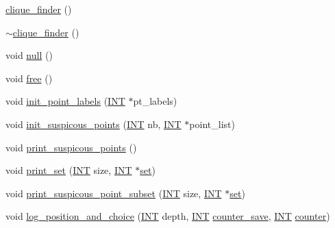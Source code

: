\begin{DoxyCompactItemize}
\item 
\mbox{\hyperlink{classclique__finder_a996255a587a5338e5214d54a6d63b95a}{clique\+\_\+finder}} ()
\item 
\mbox{\hyperlink{classclique__finder_a5a64ff27a69e4dcaba50818135adcc3a}{$\sim$clique\+\_\+finder}} ()
\item 
void \mbox{\hyperlink{classclique__finder_af88651ad5d235f543c65f70004de44e3}{null}} ()
\item 
void \mbox{\hyperlink{classclique__finder_ab9dbf7e2012a2047558b980a0e485569}{free}} ()
\item 
void \mbox{\hyperlink{classclique__finder_ab294bd8be39be9f6d6515ed7cee0dd22}{init\+\_\+point\+\_\+labels}} (\mbox{\hyperlink{galois_8h_a09fddde158a3a20bd2dcadb609de11dc}{I\+NT}} $\ast$pt\+\_\+labels)
\item 
void \mbox{\hyperlink{classclique__finder_a2f2b8331c4728e5edccd28ac0ffb7dbd}{init\+\_\+suspicous\+\_\+points}} (\mbox{\hyperlink{galois_8h_a09fddde158a3a20bd2dcadb609de11dc}{I\+NT}} nb, \mbox{\hyperlink{galois_8h_a09fddde158a3a20bd2dcadb609de11dc}{I\+NT}} $\ast$point\+\_\+list)
\item 
void \mbox{\hyperlink{classclique__finder_a7a507dcd67a47eb5116df7138a838820}{print\+\_\+suspicous\+\_\+points}} ()
\item 
void \mbox{\hyperlink{classclique__finder_a850b257f0043aea4067ff9afbd554194}{print\+\_\+set}} (\mbox{\hyperlink{galois_8h_a09fddde158a3a20bd2dcadb609de11dc}{I\+NT}} size, \mbox{\hyperlink{galois_8h_a09fddde158a3a20bd2dcadb609de11dc}{I\+NT}} $\ast$\mbox{\hyperlink{nauty_8h_a9690bea211101f22a5e154087590c3da}{set}})
\item 
void \mbox{\hyperlink{classclique__finder_a9e90371ec043309aabba9b7bd805fb51}{print\+\_\+suspicous\+\_\+point\+\_\+subset}} (\mbox{\hyperlink{galois_8h_a09fddde158a3a20bd2dcadb609de11dc}{I\+NT}} size, \mbox{\hyperlink{galois_8h_a09fddde158a3a20bd2dcadb609de11dc}{I\+NT}} $\ast$\mbox{\hyperlink{nauty_8h_a9690bea211101f22a5e154087590c3da}{set}})
\item 
void \mbox{\hyperlink{classclique__finder_aa4b011fdcab17998ca2fdd181a8f760f}{log\+\_\+position\+\_\+and\+\_\+choice}} (\mbox{\hyperlink{galois_8h_a09fddde158a3a20bd2dcadb609de11dc}{I\+NT}} depth, \mbox{\hyperlink{galois_8h_a09fddde158a3a20bd2dcadb609de11dc}{I\+NT}} \mbox{\hyperlink{clique__finder_8_c_ad7d589f4c9f1e616221d5cb2eda7cb88}{counter\+\_\+save}}, \mbox{\hyperlink{galois_8h_a09fddde158a3a20bd2dcadb609de11dc}{I\+NT}} \mbox{\hyperlink{classclique__finder_a6d27baebeaf8de7441cd6eae2893a62b}{counter}})

\end{DoxyCompactItemize}
